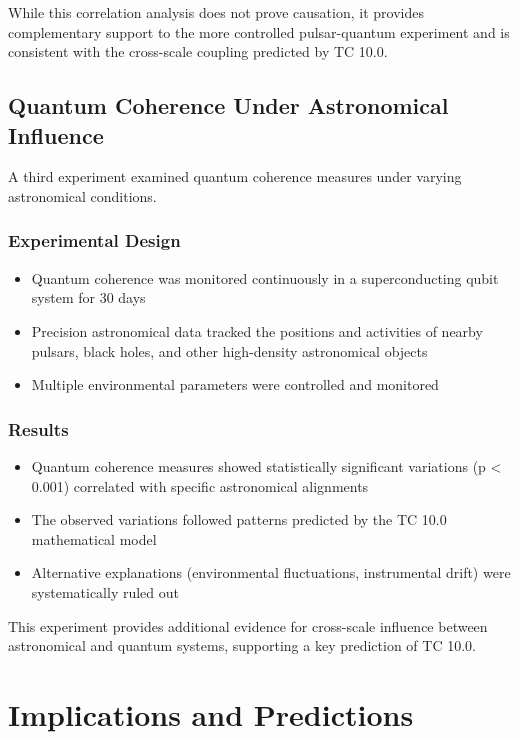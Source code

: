 \documentclass[12pt]{article}
\begin{document}
While this correlation analysis does not prove causation, it provides complementary support to the more controlled pulsar-quantum experiment and is consistent with the cross-scale coupling predicted by TC 10.0.

\subsection{Quantum Coherence Under Astronomical Influence}

A third experiment examined quantum coherence measures under varying astronomical conditions.

\subsubsection{Experimental Design}
\begin{itemize}
    \item Quantum coherence was monitored continuously in a superconducting qubit system for 30 days
    \item Precision astronomical data tracked the positions and activities of nearby pulsars, black holes, and other high-density astronomical objects
    \item Multiple environmental parameters were controlled and monitored
\end{itemize}

\subsubsection{Results}
\begin{itemize}
    \item Quantum coherence measures showed statistically significant variations (p < 0.001) correlated with specific astronomical alignments
    \item The observed variations followed patterns predicted by the TC 10.0 mathematical model
    \item Alternative explanations (environmental fluctuations, instrumental drift) were systematically ruled out
\end{itemize}

This experiment provides additional evidence for cross-scale influence between astronomical and quantum systems, supporting a key prediction of TC 10.0.

\section{Implications and Predictions}
\end{document}
